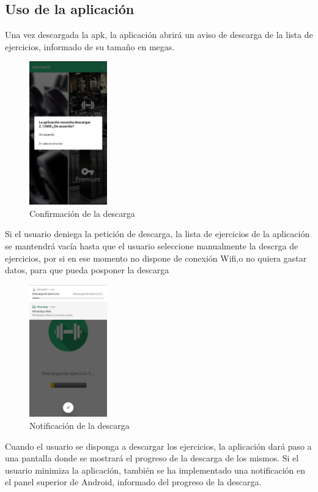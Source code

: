 \documentclass[11pt,a4paper]{report}
\begin{document}
\subsection{Uso de la aplicación}
Una vez descargada la apk, la aplicación abrirá un aviso de descarga de la lista de ejercicios, informado de su tamaño en megas.
\begin{figure}[H]
	\centering
	\includegraphics[width=0.3\textwidth]{graficos/manual/ConfirmacionDescarga.jpg}
	\caption{Confirmación de la descarga}
\end{figure}
Si el usuario deniega la petición de descarga, la lista de ejercicios de la aplicación se mantendrá vacía hasta que el usuario seleccione manualmente la descrga de ejercicios, por si en ese momento no dispone de conexión Wifi,o no quiera gastar datos, para que pueda posponer la descarga
\begin{figure}[H]
	\centering
	\includegraphics[width=0.3\textwidth]{graficos/manual/NotificacionDescarga.jpg}
	\caption{Notificación de la descarga}
\end{figure}
Cuando el usuario se disponga a descargar los ejercicios, la aplicación dará paso a una pantalla donde se mostrará el progreso de la descarga de los mismos. Si el usuario minimiza la aplicación, también se ha implementado una notificación en el panel superior de Android, informado del progreso de la descarga.
\end{document}
